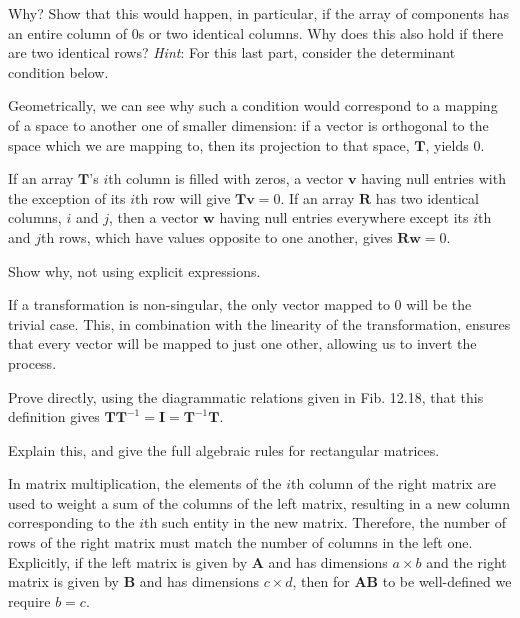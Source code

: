 \documentclass[../the-road-to-reality.tex]{subfiles}
\begin{document}
\begin{questions}
\question Why? Show that this would happen, in particular, if the array of components has an entire column of $0$s or two identical columns. Why does this also hold if there are two identical rows? \textit{Hint}: For this last part, consider the determinant condition below.

\begin{solution}
        Geometrically, we can see why such a condition would correspond to a mapping of a space to another one of smaller dimension: if a vector is orthogonal to the space which we are mapping to, then its projection to that space, $\mathbf{T}$, yields $0$.

        If an array $\mathbf{T}$'s $i$th column is filled with zeros, a vector $\mathbf{v}$ having null entries with the exception of its $i$th row will give $\mathbf{Tv} = 0$. If an array $\mathbf{R}$ has two identical columns, $i$ and $j$, then a vector $\mathbf{w}$ having null entries everywhere except its $i$th and $j$th rows, which have values opposite to one another, gives $\mathbf{Rw} = 0$.
\end{solution}

\question Show why, not using explicit expressions.

\begin{solution}
        If a transformation is non-singular, the only vector mapped to $0$ will be the trivial case. This, in combination with the linearity of the transformation, ensures that every vector will be mapped to just one other, allowing us to invert the process.
\end{solution}

\question Prove directly, using the diagrammatic relations given in Fib. 12.18, that this definition gives $\mathbf{T}\mathbf{T}^{-1} = \mathbf{I} = \mathbf{T}^{-1}\mathbf{T}$.

\question Explain this, and give the full algebraic rules for rectangular matrices.

\begin{solution}
        In matrix multiplication, the elements of the $i$th column of the right matrix are used to weight a sum of the columns of the left matrix, resulting in a new column corresponding to the $i$th such entity in the new matrix. Therefore, the number of rows of the right matrix must match the number of columns in the left one. Explicitly, if the left matrix is given by $\mathbf{A}$ and has dimensions $a\times{b}$ and the right matrix  is given by $\mathbf{B}$ and has dimensions $c\times{d}$, then for $\mathbf{AB}$ to be well-defined we require $b = c$.


\end{solution}
\end{questions}
\end{document}
